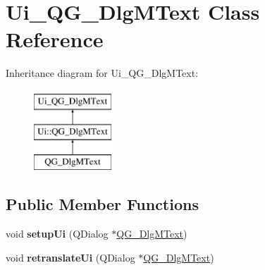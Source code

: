 \hypertarget{classUi__QG__DlgMText}{\section{Ui\-\_\-\-Q\-G\-\_\-\-Dlg\-M\-Text Class Reference}
\label{classUi__QG__DlgMText}
}
Inheritance diagram for Ui\-\_\-\-Q\-G\-\_\-\-Dlg\-M\-Text\-:\begin{figure}[H]
\begin{center}
\leavevmode
\includegraphics[height=3.000000cm]{classUi__QG__DlgMText}
\end{center}
\end{figure}
\subsection*{Public Member Functions}
\begin{DoxyCompactItemize}
\item 
\hypertarget{classUi__QG__DlgMText_a88c1cec258754e88deb6f76860780e80}{void {\bfseries setup\-Ui} (Q\-Dialog $\ast$\hyperlink{classQG__DlgMText}{Q\-G\-\_\-\-Dlg\-M\-Text})}\label{classUi__QG__DlgMText_a88c1cec258754e88deb6f76860780e80}

\item 
\hypertarget{classUi__QG__DlgMText_a7f5622a39407dc3213ccc9619a6ca95e}{void {\bfseries retranslate\-Ui} (Q\-Dialog $\ast$\hyperlink{classQG__DlgMText}{Q\-G\-\_\-\-Dlg\-M\-Text})}\label{classUi__QG__DlgMText_a7f5622a39407dc3213ccc9619a6ca95e}

\end{DoxyCompactItemize}

